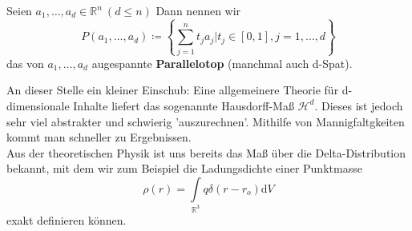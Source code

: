 \begin{definition}[Parallelotop]
    Seien $a_1, \ldots, a_d \in \mathbb{R}^n \ (d \leq n)$ Dann nennen wir
    \begin{equation*}
    	P \left( a_1, \ldots, a_d \right) \coloneqq 
    	\left\lbrace 
    	\sum\limits_{j=1}^n t_j a_j | t_j \in [0,1], j = 1, \ldots, d    
    	\right\rbrace
    \end{equation*}
    das von $a_1, \ldots, a_d $ augespannte \textbf{Parallelotop} (manchmal auch d-Spat).
\end{definition}

An dieser Stelle ein kleiner Einschub: Eine allgemeinere Theorie für d-dimensionale Inhalte liefert das sogenannte
Hausdorff-Maß $\mathcal{H}^d$. Dieses ist jedoch sehr viel abstrakter und schwierig 
'auszurechnen'. Mithilfe von Mannigfaltgkeiten kommt man schneller zu Ergebnissen. \\
Aus der theoretischen Physik ist uns bereits das Maß über die Delta-Distribution bekannt, mit dem wir zum Beispiel die Ladungsdichte einer Punktmasse 
\begin{equation*}
\rho(r)=\int\limits_{\mathbb{R}^3}q\delta(r-r_o)\mathrm{d}V
\end{equation*}
exakt definieren können. 

